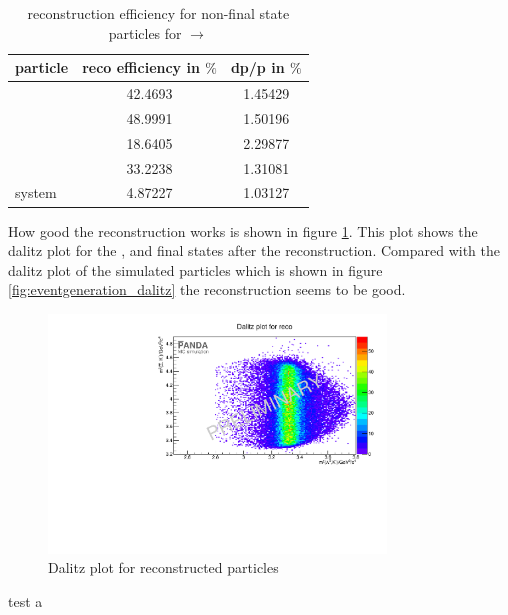 		\begin{table}
		\centering
		\caption{reconstruction efficiency for non-final state particles for \pbarpSystem $\rightarrow$ \excitedanticascade \cascade}
		\label{tab:non-finalstate_efficiency_cc}
		
		\begin{tabular}{lcc}
		
			\hline
			particle & reco efficiency in $\%$ & dp/p in $\%$ \\\hline
			\hline
			\lam & 42.4693&   1.45429 \\
			\alam & 48.9991&   1.50196\\
			\cascade & 18.6405&   2.29877\\
			\excitedanticascade & 33.2238&   1.31081\\
			\excitedanticascade \cascade system & 4.87227&   1.03127\\\hline
			 	
		\end{tabular}
	\end{table}
	
	How good the reconstruction works is shown in figure \ref{fig:reco_dalitzplot}.
	This plot shows the dalitz plot for the \anticascade, \lam and \kminus final states after the reconstruction. 
	Compared with the dalitz plot of the simulated particles which is shown in figure \ref{fig:eventgeneration_dalitz} the reconstruction seems to be good.
	
	\begin{figure}
		\centering
		\includegraphics[width=0.8\textwidth]{./plots/pbarp/Dalitzplot_reco.pdf}
		\caption{Dalitz plot for reconstructed particles}
		\label{fig:reco_dalitzplot}
	
	\end{figure}
	
	test a
	
